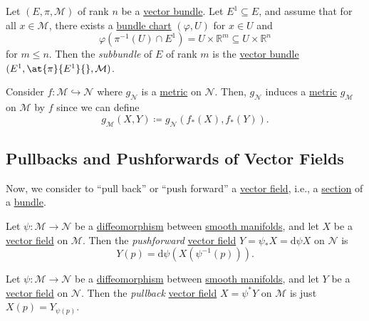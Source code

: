 \begin{definition}[Subbundle]\label{def:subbundle}
	Let \((E, \pi , \mathcal{M} )\) of rank \(n\) be a \hyperref[def:vector-bundle]{vector bundle}. Let \(E^1 \subseteq E\), and assume that for all \(x\in \mathcal{M} \), there exists a \hyperref[def:bundle-chart]{bundle chart} \((\varphi , U)\) for \(x\in U\) and
	\[
		\varphi (\pi ^{-1} (U) \cap E^1) = U \times \mathbb{R} ^m \subseteq U \times \mathbb{R} ^n
	\]
	for \(m \leq n\). Then the \emph{subbundle} of \(E\) of rank \(m\) is the \hyperref[def:vector-bundle]{vector bundle} \((E^1, \at{\pi }{E^1}{}, \mathcal{M} )\).
\end{definition}

\begin{eg}
	Consider \(f\colon \mathcal{M} \hookrightarrow \mathcal{N} \) where \(g_{\mathcal{N} } \) is a \hyperref[def:pseudo-Riemannian-metric]{metric} on \(\mathcal{N} \). Then, \(g_{\mathcal{N} } \) induces a \hyperref[def:pseudo-Riemannian-metric]{metric} \(g_{\mathcal{M} } \) on \(\mathcal{M} \) by \(f\) since we can define
	\[
		g_{\mathcal{M} } (X, Y) \coloneqq  g_{\mathcal{N} } (f_{\ast} (X), f_{\ast} (Y)).
	\]
\end{eg}

\subsection{Pullbacks and Pushforwards of Vector Fields}
Now, we consider to ``pull back'' or ``push forward'' a \hyperref[def:vector-field]{vector field}, i.e., a \hyperref[def:section]{section} of a \hyperref[def:bundle]{bundle}.

\begin{definition}[Pushforward]\label{def:pushforward}
	Let \(\psi \colon \mathcal{M} \to \mathcal{N} \) be a \hyperref[def:diffeomorphism]{diffeomorphism} between \hyperref[def:smooth-manifold]{smooth manifolds}, and let \(X\) be a \hyperref[def:vector-field]{vector field} on \(\mathcal{M} \). Then the \emph{pushforward} \hyperref[def:vector-field]{vector field} \(Y = \psi _\ast X = \mathrm{d} \psi X\) on \(\mathcal{N} \) is
	\[
		Y(p) = \mathrm{d} \psi (X(\psi ^{-1} (p))).
	\]
\end{definition}

\begin{definition}[Pullback]\label{def:pullback}
	Let \(\psi \colon \mathcal{M} \to \mathcal{N} \) be a \hyperref[def:diffeomorphism]{diffeomorphism} between \hyperref[def:smooth-manifold]{smooth manifolds}, and let \(Y\) be a \hyperref[def:vector-field]{vector field} on \(\mathcal{N} \). Then the \emph{pullback} \hyperref[def:vector-field]{vector field} \(X = \psi ^\ast Y\) on \(\mathcal{M} \) is just \(X(p) = Y_{\psi (p)}\).
\end{definition}

